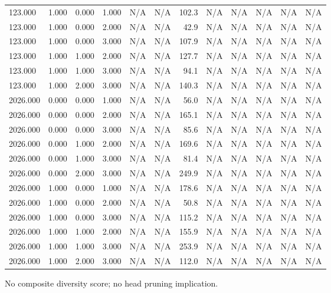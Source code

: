 \begin{table}[h!]
\begin{tabular}{lrrrrrrrrrrr}
123.000 & 1.000 & 0.000 & 1.000 & N/A & N/A & 102.3 & N/A & N/A & N/A & N/A & N/A \\
123.000 & 1.000 & 0.000 & 2.000 & N/A & N/A & 42.9 & N/A & N/A & N/A & N/A & N/A \\
123.000 & 1.000 & 0.000 & 3.000 & N/A & N/A & 107.9 & N/A & N/A & N/A & N/A & N/A \\
123.000 & 1.000 & 1.000 & 2.000 & N/A & N/A & 127.7 & N/A & N/A & N/A & N/A & N/A \\
123.000 & 1.000 & 1.000 & 3.000 & N/A & N/A & 94.1 & N/A & N/A & N/A & N/A & N/A \\
123.000 & 1.000 & 2.000 & 3.000 & N/A & N/A & 140.3 & N/A & N/A & N/A & N/A & N/A \\
2026.000 & 0.000 & 0.000 & 1.000 & N/A & N/A & 56.0 & N/A & N/A & N/A & N/A & N/A \\
2026.000 & 0.000 & 0.000 & 2.000 & N/A & N/A & 165.1 & N/A & N/A & N/A & N/A & N/A \\
2026.000 & 0.000 & 0.000 & 3.000 & N/A & N/A & 85.6 & N/A & N/A & N/A & N/A & N/A \\
2026.000 & 0.000 & 1.000 & 2.000 & N/A & N/A & 169.6 & N/A & N/A & N/A & N/A & N/A \\
2026.000 & 0.000 & 1.000 & 3.000 & N/A & N/A & 81.4 & N/A & N/A & N/A & N/A & N/A \\
2026.000 & 0.000 & 2.000 & 3.000 & N/A & N/A & 249.9 & N/A & N/A & N/A & N/A & N/A \\
2026.000 & 1.000 & 0.000 & 1.000 & N/A & N/A & 178.6 & N/A & N/A & N/A & N/A & N/A \\
2026.000 & 1.000 & 0.000 & 2.000 & N/A & N/A & 50.8 & N/A & N/A & N/A & N/A & N/A \\
2026.000 & 1.000 & 0.000 & 3.000 & N/A & N/A & 115.2 & N/A & N/A & N/A & N/A & N/A \\
2026.000 & 1.000 & 1.000 & 2.000 & N/A & N/A & 155.9 & N/A & N/A & N/A & N/A & N/A \\
2026.000 & 1.000 & 1.000 & 3.000 & N/A & N/A & 253.9 & N/A & N/A & N/A & N/A & N/A \\
2026.000 & 1.000 & 2.000 & 3.000 & N/A & N/A & 112.0 & N/A & N/A & N/A & N/A & N/A \\
\bottomrule
\end{tabular}
\vspace{4pt}
\footnotesize{No composite diversity score; no head pruning implication.}\\
\end{table}
